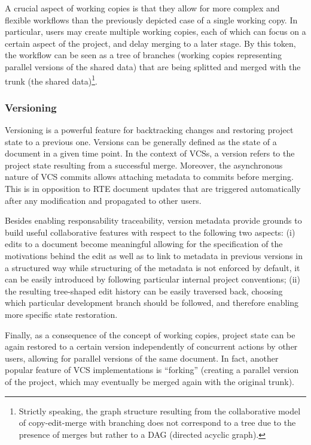 \documentclass{sig-alternate}
\begin{document}
A crucial aspect of working copies is that they allow for more complex and flexible workflows
than the previously depicted case of a single working copy. In particular, users may create
multiple working copies, each of which can focus on a certain aspect of the project, and
delay merging to a later stage.
By this token, the workflow can be seen as a tree of branches (working copies
representing parallel versions of the shared data) that are being splitted and merged with
the trunk (the shared data)\footnote{
  Strictly speaking, the graph structure resulting from the collaborative model of copy-edit-merge
  with branching does not correspond to a tree due to the presence of merges but rather to a DAG
  (directed acyclic graph).
}.

\subsubsection{Versioning}\label{subsec:versioning}
Versioning is a powerful feature for backtracking changes and restoring project state to a
previous one. Versions can be generally defined as the state of a document in a given time point.
In the context of VCSs, a version refers to the project state resulting from a successful merge.
Moreover, the asynchronous nature of VCS commits allows attaching metadata to commits before
merging. This is in opposition to RTE document updates that are triggered automatically
after any modification and propagated to other users.

Besides enabling responsability traceability, version metadata provide grounds to build useful
collaborative features with respect to the following two aspects: (i) edits to a document become
meaningful allowing for the specification of the motivations behind the edit as well as to link
to metadata in previous versions in a structured way \textemdash while structuring of the metadata
is not enforced by default, it can be easily introduced by following particular internal project
conventions; (ii) the resulting tree-shaped edit history can be easily traversed back, choosing
which particular development branch should be
followed, and therefore enabling more specific state restoration.

Finally, as a consequence of the concept of working copies, project state can be again restored
to a certain version independently of concurrent actions by other users, allowing for parallel
versions of the same document. In fact, another popular feature of VCS implementations
is ``forking'' (creating a parallel version of the project, which may eventually be merged
again with the original trunk).
\end{document}
